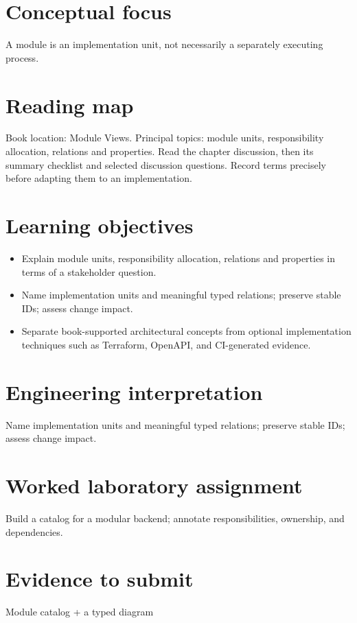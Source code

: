\documentclass[10pt,letterpaper]{article}
\begin{document}
\DocProvenance
\section{Conceptual focus}
A module is an implementation unit, not necessarily a separately executing process.

\section{Reading map}
Book location: Module Views. Principal topics: module units, responsibility allocation, relations and properties. Read the chapter discussion, then its summary checklist and selected discussion questions. Record terms precisely before adapting them to an implementation.

\section{Learning objectives}
\begin{itemize}
\item Explain module units, responsibility allocation, relations and properties in terms of a stakeholder question.
\item Name implementation units and meaningful typed relations; preserve stable IDs; assess change impact.
\item Separate book-supported architectural concepts from optional implementation techniques such as Terraform, OpenAPI, and CI-generated evidence.
\end{itemize}
\section{Engineering interpretation}
Name implementation units and meaningful typed relations; preserve stable IDs; assess change impact.

\section{Worked laboratory assignment}
Build a catalog for a modular backend; annotate responsibilities, ownership, and dependencies.

\section{Evidence to submit}
Module catalog + a typed diagram
\end{document}
